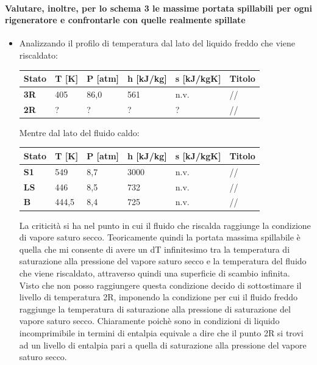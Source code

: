 \documentclass[a4paper, twoside, 12pt]{report}
\begin{document}
\paragraph{Valutare, inoltre, per lo schema 3 le massime portata spillabili per ogni rigeneratore e confrontarle con quelle realmente spillate}
\begin{itemize}
	\item[\textbf{1° Spillamento}] Analizzando il profilo di temperatura dal lato del liquido freddo che viene riscaldato:
	\begin{center}
		\begin{tabular}{| l || l | l | l | l | l |}
			\hline
			\textbf{Stato} & \textbf{T [K]} & \textbf{P [atm]} & \textbf{h [kJ/kg]} & \textbf{s [kJ/kgK]} & \textbf{Titolo}\\ 
			\hline
			\textbf{3R} & 405 & 86,0 & 561 & n.v. & //\\
			\hline
			\textbf{2R} & ? & ? & ? & ? & //\\
			\hline
		\end{tabular}
	\end{center}
	Mentre dal lato del fluido caldo:
	\begin{center}
		\begin{tabular}{| l || l | l | l | l | l |}
			\hline
			\textbf{Stato} & \textbf{T [K]} & \textbf{P [atm]} & \textbf{h [kJ/kg]} & \textbf{s [kJ/kgK]} & \textbf{Titolo}\\ 
			\hline
			\textbf{S1} & 549 & 8,7 & 3000 & n.v. & //\\
			\hline
			\textbf{LS} & 446 & 8,5 & 732 & n.v. & //\\
			\hline
			\textbf{B} & 444,5 & 8,4 & 725 & n.v. & //\\
			\hline
		\end{tabular}
	\end{center}
	La criticità si ha nel punto in cui il fluido che riscalda raggiunge la condizione di vapore saturo secco. Teoricamente quindi la portata massima spillabile è quella che mi consente di avere un dT infinitesimo tra la temperatura di saturazione alla pressione del vapore saturo secco e la temperatura del fluido che viene riscaldato, attraverso quindi una superficie di scambio infinita.\\ 
	Visto che non posso raggiungere questa condizione decido di sottostimare il livello di temperatura 2R, imponendo la condizione per cui il fluido freddo raggiunge la temperatura di saturazione alla pressione di saturazione del vapore saturo secco. Chiaramente poichè sono in condizioni di liquido incomprimibile in termini di entalpia equivale a dire che il punto 2R si trovi ad un livello di entalpia pari a quella di saturazione alla pressione del vapore saturo secco.\\

\end{itemize}
\end{document}
